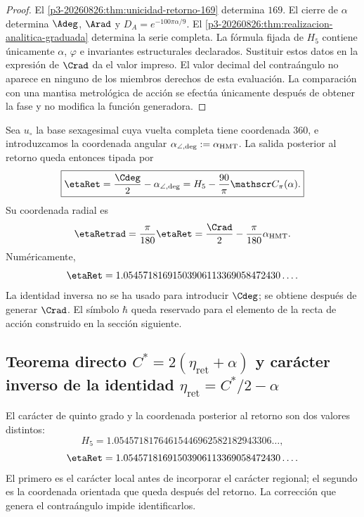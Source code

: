 \begin{proof}
El \cref{p3-20260826:thm:unicidad-retorno-169} determina \(169\). El cierre de
\(\alpha\) determina \(\Adeg\), \(\Arad\) y
\(D_A=e^{-100\pi\alpha/9}\). El \cref{p3-20260826:thm:realizacion-analitica-graduada}
determina la serie completa. La fórmula fijada de \(H_5\) contiene únicamente
\(\alpha\), \(\varphi\) e invariantes estructurales declarados. Sustituir
estos datos en la expresión de \(\Crad\) da el valor impreso. El valor decimal
del contraángulo no aparece en ninguno de los miembros derechos de esta
evaluación. La comparación con una mantisa metrológica de acción se efectúa
únicamente después de obtener la fase y no modifica la función generadora.
\end{proof}

Sea \(u_\circ\) la base sexagesimal cuya vuelta completa tiene coordenada
\(360\), e introduzcamos la coordenada angular
\(\alpha_{\angle,{\rm deg}}:=\alpha_{\rm HMT}\). La salida posterior al
retorno queda entonces tipada por
\[
\boxed{
\etaRet
=\frac{\Cdeg}2-\alpha_{\angle,{\rm deg}}
=H_5-\frac{90}{\pi}\mathscr C_\pi(\alpha).}
\]
Su coordenada radial es
\[
 \etaRetrad=\frac{\pi}{180}\etaRet
 =\frac{\Crad}{2}-\frac{\pi}{180}\alpha_{\rm HMT}.
\]
Numéricamente,
\[
\etaRet
=1.05457181691503906113369058472430\ldots.
\]
La identidad inversa no se ha usado para introducir \(\Cdeg\); se obtiene
después de generar \(\Crad\). El símbolo \(\hbar\) queda reservado para el
elemento de la recta de acción construido en la sección siguiente.

\subsection{Teorema directo \texorpdfstring{\(C^*=2(\eta_{\mathrm{ret}}+\alpha)\)}{C*=2(eta_ret+alpha)} y carácter inverso de la identidad \texorpdfstring{\(\eta_{\mathrm{ret}}=C^*/2-\alpha\)}{eta_ret=C*/2-alpha}}
\label{sec:s102:c38:4:3}


El carácter de quinto grado y la coordenada posterior al retorno
son dos valores distintos:
\[
H_5
=1.05457181764615446962582182943306\ldots,
\]
\[
\etaRet
=1.05457181691503906113369058472430\ldots.
\]
El primero es el carácter local antes de incorporar el carácter regional; el
segundo es la coordenada orientada que queda después del retorno. La corrección
que genera el contraángulo impide identificarlos.

